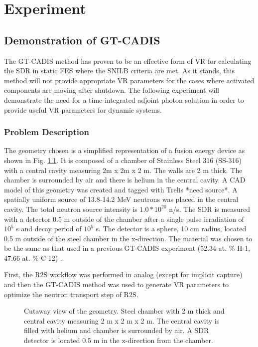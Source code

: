 \chapter{Experiment} \label{ch:exp}

\section{Demonstration of GT-CADIS} \label{sec:gtcadis}
The GT-CADIS method has proven to be an effective form of VR for calculating the
SDR in static FES where the SNILB criteria are met.  As it stands, this method
will not provide appropriate VR parameters for the cases where activated
components are moving
after shutdown.  The following experiment will demonstrate the need for a
time-integrated adjoint photon solution in order to provide useful VR parameters for
dynamic systems.

\subsection{Problem Description} \label{sec:description}
The geometry chosen is a simplified representation of a fusion energy device as
shown in Fig. \ref{fig:geom}.
It is composed of a chamber of Stainless Steel 316 (SS-316) with a central cavity measuring
2m x 2m x 2 m.  The walls are 2 m thick.  The chamber is surrounded by air and
there is helium in the central cavity.  A CAD model of this geometry was created and tagged
with Trelis *need source*.  A spatially uniform source of
13.8-14.2 MeV neutrons was placed in the central cavity. The total neutron
source intensity is $1.0*10^{20}$ n/s.
The SDR is measured with a detector
0.5 m outside of the chamber after a single pulse irradiation of $10^5$ s and
decay period of $10^5$ s.  The detector is a sphere, 10 cm radius, located 0.5
m outside of the steel chamber in the x-direction. The material was chosen to
be the same as that used in a previous GT-CADIS experiment (52.34 at. \% H-1,
47.66 at. \% C-12) \cite{gtcadis}.  

First, the R2S workflow was performed in analog (except for implicit capture) 
and then the GT-CADIS method was used to generate VR parameters
to optimize the neutron transport step of R2S.

\begin{figure}\label{fig:geom}
	\caption[Experimental Geometry] 
	{Cutaway view of the geometry.  Steel
	chamber with 2 m thick and central cavity measuring 2 m x 2 m x 2 m.
	The central cavity is filled with helium and chamber is surrounded by air.
	A SDR detector is located 0.5 m in the x-direction from the chamber.}
\end{figure}

